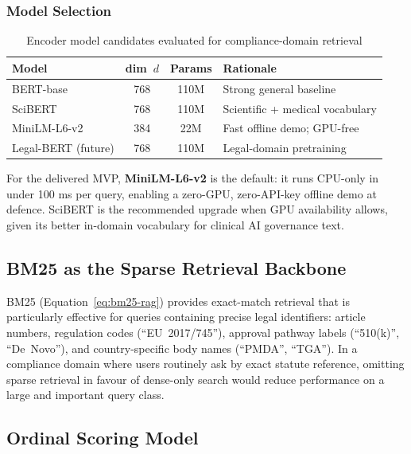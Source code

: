 \subsubsection{Model Selection}

\begin{table}[htbp]
\centering
\caption{Encoder model candidates evaluated for compliance-domain retrieval}
\label{tab:encoders}
\begin{tabular}{@{}p{3.0cm}cc p{4.5cm}@{}}
\toprule
\textbf{Model} & \textbf{dim~$d$} & \textbf{Params} & \textbf{Rationale} \\
\midrule
BERT-base \cite{devlin2019}           & 768 & 110M & Strong general baseline \\
SciBERT \cite{beltagy2019}            & 768 & 110M & Scientific + medical vocabulary \\
MiniLM-L6-v2                          & 384 & 22M  & Fast offline demo; GPU-free \\
Legal-BERT (future)                   & 768 & 110M & Legal-domain pretraining \\
\bottomrule
\end{tabular}
\end{table}

For the delivered MVP, \textbf{MiniLM-L6-v2} is the default: it runs CPU-only in
under 100 ms per query, enabling a zero-GPU, zero-API-key offline demo at defence.
SciBERT is the recommended upgrade when GPU availability allows, given its better
in-domain vocabulary for clinical AI governance text.

\subsection{BM25 as the Sparse Retrieval Backbone}
\label{sec:ai-bm25}

BM25 (Equation~\eqref{eq:bm25-rag}) provides exact-match retrieval that is particularly
effective for queries containing precise legal identifiers: article numbers,
regulation codes (``EU~2017/745''), approval pathway labels (``510(k)'',
``De~Novo''), and country-specific body names (``PMDA'', ``TGA''). In a compliance
domain where users routinely ask by exact statute reference, omitting sparse retrieval
in favour of dense-only search would reduce performance on a large and important query
class.

\subsection{Ordinal Scoring Model}
\label{sec:ai-scoring}

